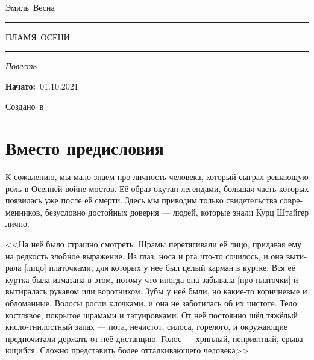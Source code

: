 \documentclass[a4paper,12pt,fleqn]{book}\usepackage{polyglossia}\setdefaultlanguage[babelshorthands=true]{russian}\setotherlanguage{english}\defaultfontfeatures{Ligatures=TeX,Mapping=tex-text}\usepackage{xcolor}\newcommand{\ml}[3]{#2}
\newcommand{\tofaauthor}{\ml{$0$}{Эмиль~Весна}{Emil~Viesn\'{a}}}
\newcommand{\tofatitle}{\ml{$0$}{ПЛАМЯ~ОСЕНИ}{Flame~of~the~Fall}}
\newcommand{\tofastarted}{01.10.2021}
\newcommand{\asterism}{\vspace{1em}{\centering\Large\bfseries$\ast~\ast~\ast$\par}\vspace{1em}}
\begin{document}

\begin{titlepage}
{\centering{~\par}\vspace{0.25\textheight}
{\LARGE\tofaauthor}\par
\vspace{1.0cm}\rule{17em}{1pt}\par\vspace{0.3cm}
{\Huge\textsc{\tofatitle}\par}
\vspace{0.3cm}\rule{17em}{2pt}\par\vspace{1.0cm}
{\Large\textit{\ml{$0$}{Повесть}{Novella}}\par}
\vspace{0.5cm}\asterism\par\vspace{1.0cm}
{\textbf{\ml{$0$}{Начато:}{Started:}}~\tofastarted\par}\vfill
{\Large\ml{$0$}{Создано~в}{Created~by}~\XeLaTeX}\par}
\end{titlepage}

\tableofcontents

\section{Вместо предисловия}

К сожалению, мы мало знаем про личность человека, который сыграл решающую роль в Осенней войне мостов.
Её образ окутан легендами, большая часть которых появилась уже после её смерти.
Здесь мы приводим только свидетельства современников, безусловно достойных доверия --- людей, которые знали Курц Штайгер лично.

<<На неё было страшно смотреть.
Шрамы перетягивали её лицо, придавая ему на редкость злобное выражение.
Из глаз, носа и рта что-то сочилось, и она вытирала [лицо] платочками, для которых у неё был целый карман в куртке.
Вся её куртка была измазана в этом, потому что иногда она забывала [про платочки] и вытиралась рукавом или воротником.
Зубы у неё были, но какие-то коричневые и обломанные.
Волосы росли клочками, и она не заботилась об их чистоте.
Тело костлявое, покрытое шрамами и татуировками.
От неё постоянно шёл тяжёлый кисло-гнилостный запах --- пота, нечистот, силоса, горелого, и окружающие предпочитали держать от неё дистанцию.
Голос --- хриплый, неприятный, срывающийся.
Сложно представить более отталкивающего человека>>.
\end{document}
